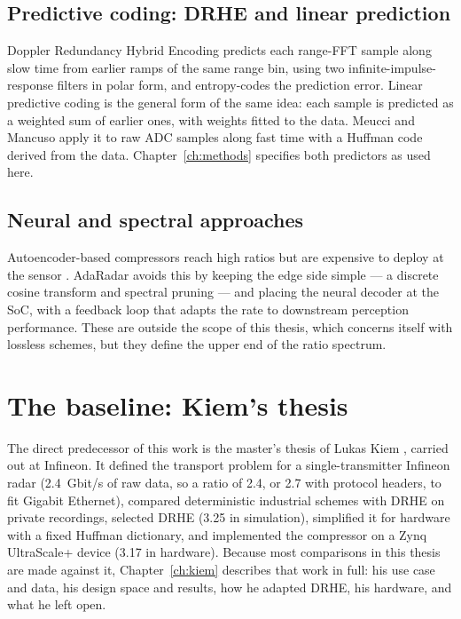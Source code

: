 \subsection{Predictive coding: DRHE and linear prediction}

Doppler Redundancy Hybrid Encoding \cite{li2014,zivkovic2015} predicts each
range-FFT sample along slow time from earlier ramps of the same range bin,
using two infinite-impulse-response filters in polar form, and entropy-codes
the prediction error. Linear predictive coding is the general form of the same
idea: each sample is predicted as a weighted sum of earlier ones, with weights
fitted to the data. Meucci and Mancuso \cite{meucci2022} apply it to raw ADC
samples along fast time with a Huffman code derived from the data.
Chapter~\ref{ch:methods} specifies both predictors as used here.

\subsection{Neural and spectral approaches}

Autoencoder-based compressors reach high ratios but are expensive to deploy at
the sensor \cite{cheng2021}. AdaRadar \cite{park2026} avoids this by keeping the
edge side simple --- a discrete cosine transform and spectral pruning --- and
placing the neural decoder at the SoC, with a feedback loop that adapts the
rate to downstream perception performance. These are outside the scope of this
thesis, which concerns itself with lossless schemes, but they define the upper
end of the ratio spectrum.

\section{The baseline: Kiem's thesis}
\label{sec:kiem}

The direct predecessor of this work is the master's thesis of Lukas Kiem
\cite{kiem2025}, carried out at Infineon. It defined the transport problem for
a single-transmitter Infineon radar (\SI{2.4}{Gbit/s} of raw data, so a ratio
of \num{2.4}, or \num{2.7} with protocol headers, to fit Gigabit Ethernet),
compared deterministic industrial schemes with DRHE on private recordings,
selected DRHE (\num{3.25} in simulation), simplified it for hardware with a
fixed Huffman dictionary, and implemented the compressor on a Zynq UltraScale+
device (\num{3.17} in hardware). Because most comparisons in this thesis are
made against it, Chapter~\ref{ch:kiem} describes that work in full: his use
case and data, his design space and results, how he adapted DRHE, his hardware,
and what he left open.

